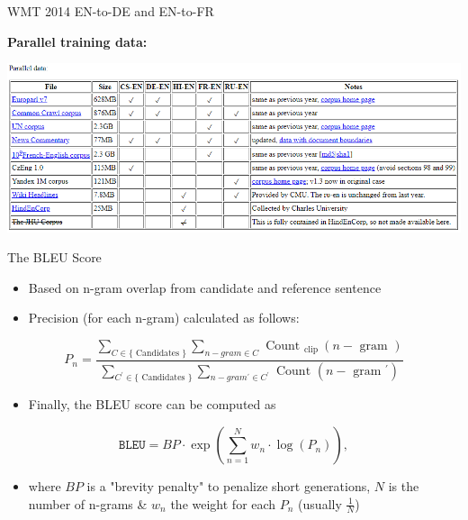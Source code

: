 \begin{vbframe}{WMT 2014 EN-to-DE and EN-to-FR}

\vfill

\textbf{Parallel training data:}

\includegraphics[width=.9\textwidth]{figure/wmt14}

\vfill

\end{vbframe}


\begin{vbframe}{The BLEU Score}

\vfill

\begin{itemize}
	\item Based on n-gram overlap from candidate and reference sentence
	\item Precision (for each n-gram) calculated as follows:
\end{itemize}

\begin{equation}
            P_{n} = \frac{\sum_{C \in\{\text { Candidates }\}} \sum_{n-g r a m \in C} \text { Count }_{\text {clip }}(n-\text { gram })}{\sum_{C^{\prime} \in\{\text { Candidates }\}}{\sum_{n-g r a m^{\prime} \in C^{\prime}} \text { Count }\left(n-\text { gram }^{\prime}\right)}}  \nonumber
\end{equation}

\begin{itemize}
	\item Finally, the BLEU score can be computed as
\end{itemize}

\begin{equation}
            \texttt{BLEU} = BP \cdot \exp\left(\sum_{n=1}^{N} w_n \cdot \log(P_n)\right), \nonumber
\end{equation}

\begin{itemize}
	\item where $BP$ is a "brevity penalty" to penalize short generations, $N$ is the number of n-grams \& $w_n$ the weight for each $P_n$ (usually $\frac{1}{N}$)
\end{itemize}

\vfill

\end{vbframe}

